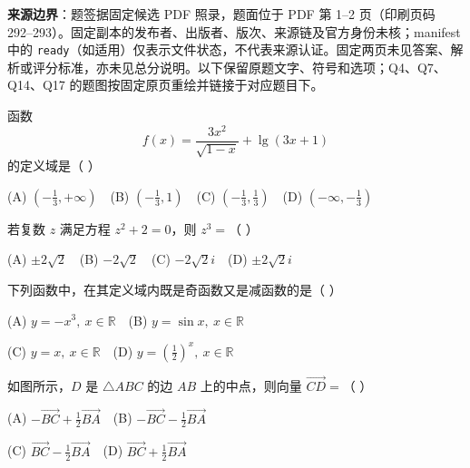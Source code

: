 

\begin{gktip}
\textbf{来源边界}：题签据固定候选 PDF 照录，题面位于 PDF 第 1–2 页（印刷页码 292–293）。固定副本的发布者、出版者、版次、来源链及官方身份未核；manifest 中的 \texttt{ready}（如适用）仅表示文件状态，不代表来源认证。固定两页未见答案、解析或评分标准，亦未见总分说明。以下保留原题文字、符号和选项；Q4、Q7、Q14、Q17 的题图按固定原页重绘并链接于对应题目下。
\end{gktip}


\begin{question}
函数
\nopagebreak[4]
\[
f(x)=\frac{3x^2}{\sqrt{1-x}}+\lg(3x+1)
\]
的定义域是（  ）

(A) \(\left(-\frac13,+\infty\right)\)　(B) \(\left(-\frac13,1\right)\)　(C) \(\left(-\frac13,\frac13\right)\)　(D) \(\left(-\infty,-\frac13\right)\)

\end{question}
\begin{question}
若复数 \(z\) 满足方程 \(z^2+2=0\)，则 \(z^3=\)（  ）

(A) \(\pm2\sqrt2\)　(B) \(-2\sqrt2\)　(C) \(-2\sqrt2 i\)　(D) \(\pm2\sqrt2 i\)

\end{question}
\begin{question}
下列函数中，在其定义域内既是奇函数又是减函数的是（  ）

(A) \(y=-x^3,\ x\in\mathbb R\)　(B) \(y=\sin x,\ x\in\mathbb R\)

(C) \(y=x,\ x\in\mathbb R\)　(D) \(y=\left(\frac12\right)^x,\ x\in\mathbb R\)

\Needspace{0.4\textheight}
\end{question}
\begin{question}
如图所示，\(D\) 是 \(\triangle ABC\) 的边 \(AB\) 上的中点，则向量 \(\overrightarrow{CD}=\)（  ）

(A) \(-\overrightarrow{BC}+\frac12\overrightarrow{BA}\)　(B) \(-\overrightarrow{BC}-\frac12\overrightarrow{BA}\)

(C) \(\overrightarrow{BC}-\frac12\overrightarrow{BA}\)　(D) \(\overrightarrow{BC}+\frac12\overrightarrow{BA}\)
\nopagebreak[4]
\begin{center}\end{center}
\nopagebreak[4]
\end{question}
